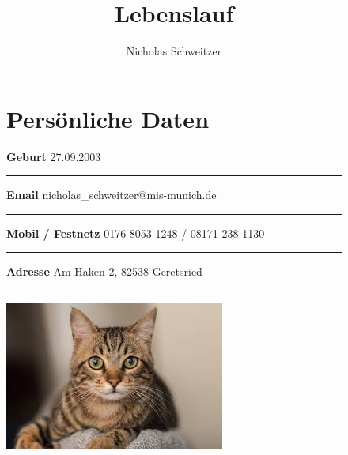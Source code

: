 \documentclass[12pt]{article}
\title{\vspace{-110pt}\LARGE Lebenslauf\vspace{-18pt}}
\author{\LARGE Nicholas Schweitzer}
\date{}
\newcommand{\sect}[1]{
  {
    \vspace{12pt}
    \section*{
      \fontsize{18}{0}\selectfont
      \hspace{-12pt}
      \vspace{-12pt}
      #1
    }
    \vspace{-6pt}
  }
}
\newcommand{\sep}{{\color{gray}\vspace{-12pt}\hrule}}
\begin{document}
\maketitle
\vspace{-32pt}


\begin{figure}[htb!]
  \begin{minipage}{0.7\textwidth}
    \sect{Pers{\"o}nliche Daten}
    \vspace{7pt}

    \textbf{Geburt} \hfill{27.09.2003} \, \\
    \sep
    \vspace{7pt}
    \textbf{Email} \hfill{nicholas\_schweitzer@mis-munich.de} \, \\
    \sep
    \vspace{7pt}
    \textbf{Mobil / Festnetz} \hfill{0176 8053 1248 / 08171 238 1130} \, \\
    \sep
    \vspace{7pt}
    \textbf{Adresse} \hfill{Am Haken 2, 82538 Geretsried \, }\\
    \sep
    \vspace{7pt}
  \end{minipage}
  \begin{minipage}{0.2\textwidth}
    \includegraphics[trim=-20 60 0 0mm, scale=0.5]{cat.jpg}
  \end{minipage}
\end{figure}
\vspace{-30pt}
\end{document}
